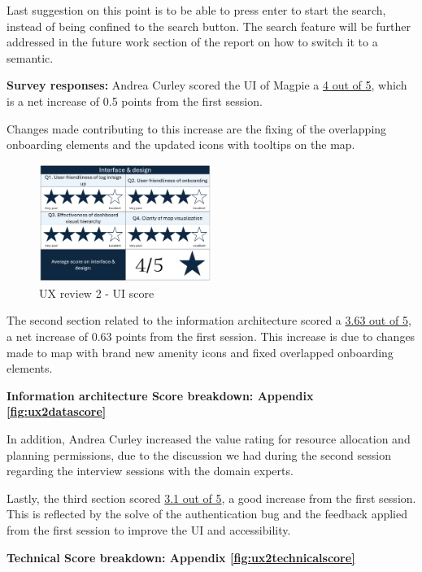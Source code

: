 Last suggestion on this point is to be able to press enter to start the search,
instead of being confined to the search button. The search feature will be
further addressed in the future work section of the report on how to switch it
to a semantic.

\newpage{}

\noindent \textbf{Survey responses:}
Andrea Curley scored the UI of Magpie a \underline{4 out of 5}, which is a net
increase of 0.5 points from the first session.

Changes made contributing to this increase are the fixing of the overlapping
onboarding elements and the updated icons with tooltips on the map.
\begin{figure}[h!]
    \centering
    \includegraphics[width=0.5\textwidth]{images/ux-survey2-ui.png}
    \caption{UX review 2 - UI score}
\end{figure}

The second section related to the information architecture scored a
\underline{3.63 out of 5}, a net increase of 0.63 points from the first session.
This increase is due to changes made to map with brand new amenity icons and
fixed overlapped onboarding elements.

\hspace{2em}\textbf{Information architecture Score breakdown: Appendix
    \ref{fig:ux2datascore}}

In addition, Andrea Curley increased the value rating for resource allocation
and planning permissions, due to the discussion we had during the second session
regarding the interview sessions with the domain experts.

Lastly, the third section scored \underline{3.1 out of 5}, a good increase from
the first session. This is reflected by the solve of the authentication bug and
the feedback applied from the first session to improve the UI and accessibility.

\hspace{2em}\textbf{Technical Score breakdown: Appendix
    \ref{fig:ux2technicalscore}}

